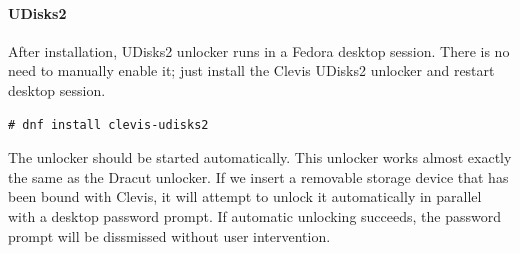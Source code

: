 \paragraph{UDisks2}\label{udisk2}
After installation, UDisks2 unlocker runs in a Fedora desktop session.
There is no need to manually enable it; just install the Clevis UDisks2 unlocker and restart desktop session.
\begin{lstlisting}[columns=fixed,basicstyle=\ttfamily\footnotesize,tabsize=4,backgroundcolor=\color{yellow!10}]
# dnf install clevis-udisks2
\end{lstlisting}
The unlocker should be started automatically.
This unlocker works almost exactly the same as the Dracut unlocker.
If we insert a removable storage device that has been bound with Clevis, it will attempt to unlock it automatically in parallel with a desktop password prompt.
If automatic unlocking succeeds, the password prompt will be dissmissed without user intervention.
